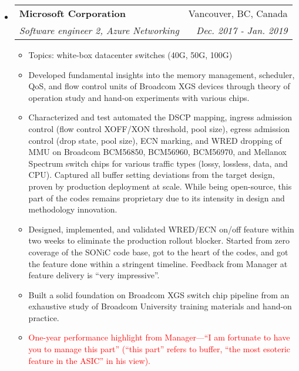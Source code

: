 \documentclass[letterpaper,11pt]{article}
\makeatletter
\newcommand{\ressubheading}[4]{
\begin{tabular*}{6.69in}{l@{\extracolsep{\fill}}r}
        \textbf{#1} & #2 \\
        \textit{#3} & \textit{#4} \\
\end{tabular*}\vspace{-6pt}
}
\newcommand{\resitem}[1]{\item #1 \vspace{-2pt}}
\makeatother
\begin{document}
\begin{CJK}{UTF8}{gbsn}
\begin{itemize}
\item
  \ressubheading{Microsoft Corporation}{Vancouver, BC, Canada}
  {Software engineer 2, Azure Networking}{Dec. 2017 - Jan. 2019}
  \begin{itemize}
  \resitem{Topics: white-box datacenter switches (40G, 50G, 100G)}
  \resitem{Developed fundamental insights into the memory management, scheduler, QoS, and flow control units of Broadcom XGS devices
  through theory of operation study and hand-on experiments with various chips.}
  \resitem{Characterized and test automated the DSCP mapping, ingress admission control (flow control XOFF/XON threshold, pool size),
  egress admission control (drop state, pool size), ECN marking, and WRED dropping of MMU
  on Broadcom BCM56850, BCM56960, BCM56970, and Mellanox Spectrum switch chips
  for various traffic types (lossy, lossless, data, and CPU).
  Captured all buffer setting deviations from the target design, proven by production deployment at scale.
  While being open-source, this part of the codes remains proprietary due to its intensity in design and methodology innovation.}
  \resitem{Designed, implemented, and validated WRED/ECN on/off feature within two weeks to eliminate the production rollout blocker.
  Started from zero coverage of the SONiC code base, got to the heart of the codes, and got the feature done within a stringent timeline.
  Feedback from Manager at feature delivery is ``very impressive''.}
  \resitem{Built a solid foundation on Broadcom XGS switch chip pipeline from an exhaustive study of Broadcom University training materials
  and hand-on practice.}
  \resitem{\textcolor{Red}{One-year performance highlight from Manager---``I am fortunate to have you to manage this part''
  (``this part'' refers to buffer, ``the most esoteric feature in the ASIC'' in his view).}}
  \end{itemize}


\end{itemize}
\end{CJK}
\end{document}
